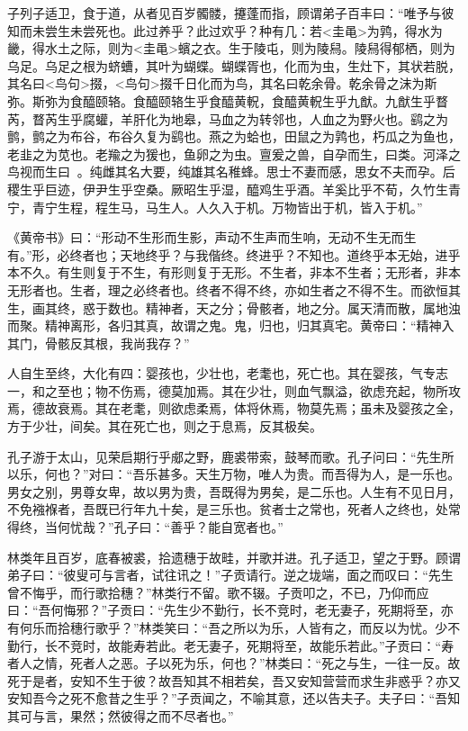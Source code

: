 \documentclass[]{article}
\begin{document}
子列子适卫，食于道，从者见百岁髑髅，攓蓬而指，顾谓弟子百丰曰：``唯予与彼知而未尝生未尝死也。此过养乎？此过欢乎？种有几：若\textless{}圭黾\textgreater{}为鹑，得水为畿，得水土之际，则为\textless{}圭黾\textgreater{}蠙之衣。生于陵屯，则为陵舄。陵舄得郁栖，则为乌足。乌足之根为蛴螬，其叶为蝴蝶。蝴蝶胥也，化而为虫，生灶下，其状若脱，其名曰\textless{}鸟句\textgreater{}掇，\textless{}鸟句\textgreater{}掇千日化而为鸟，其名曰乾余骨。乾余骨之沫为斯弥。斯弥为食醯颐辂。食醯颐辂生乎食醯黄軦，食醯黄軦生乎九猷。九猷生乎瞀芮，瞀芮生乎腐蠸，羊肝化为地皋，马血之为转邻也，人血之为野火也。鹞之为鹯，鹯之为布谷，布谷久复为鹞也。燕之为蛤也，田鼠之为鹑也，朽瓜之为鱼也，老韭之为苋也。老羭之为猨也，鱼卵之为虫。亶爰之兽，自孕而生，曰类。河泽之鸟视而生曰。纯雌其名大要，纯雄其名稚蜂。思士不妻而感，思女不夫而孕。后稷生乎巨迹，伊尹生乎空桑。厥昭生乎湿，醯鸡生乎酒。羊奚比乎不荀，久竹生青宁，青宁生程，程生马，马生人。人久入于机。万物皆出于机，皆入于机。''

《黄帝书》曰：``形动不生形而生影，声动不生声而生响，无动不生无而生有。''形，必终者也；天地终乎？与我偕终。终进乎？不知也。道终乎本无始，进乎本不久。有生则复于不生，有形则复于无形。不生者，非本不生者；无形者，非本无形者也。生者，理之必终者也。终者不得不终，亦如生者之不得不生。而欲恒其生，画其终，惑于数也。精神者，天之分；骨骸者，地之分。属天清而散，属地浊而聚。精神离形，各归其真，故谓之鬼。鬼，归也，归其真宅。黄帝曰：``精神入其门，骨骸反其根，我尚我存？''

人自生至终，大化有四：婴孩也，少壮也，老耄也，死亡也。其在婴孩，气专志一，和之至也；物不伤焉，德莫加焉。其在少壮，则血气飘溢，欲虑充起，物所攻焉，德故衰焉。其在老耄，则欲虑柔焉，体将休焉，物莫先焉；虽未及婴孩之全，方于少壮，间矣。其在死亡也，则之于息焉，反其极矣。

孔子游于太山，见荣启期行乎郕之野，鹿裘带索，鼓琴而歌。孔子问曰：``先生所以乐，何也？''对曰：``吾乐甚多。天生万物，唯人为贵。而吾得为人，是一乐也。男女之别，男尊女卑，故以男为贵，吾既得为男矣，是二乐也。人生有不见日月，不免襁褓者，吾既已行年九十矣，是三乐也。贫者士之常也，死者人之终也，处常得终，当何忧哉？''孔子曰：``善乎？能自宽者也。''

林类年且百岁，底春被裘，拾遗穗于故畦，并歌并进。孔子适卫，望之于野。顾谓弟子曰：``彼叟可与言者，试往讯之！''子贡请行。逆之垅端，面之而叹曰：``先生曾不悔乎，而行歌拾穗？''林类行不留。歌不辍。子贡叩之，不已，乃仰而应曰：``吾何悔邪？''子贡曰：``先生少不勤行，长不竞时，老无妻子，死期将至，亦有何乐而拾穗行歌乎？''林类笑曰：``吾之所以为乐，人皆有之，而反以为忧。少不勤行，长不竞时，故能寿若此。老无妻子，死期将至，故能乐若此。''子贡曰：``寿者人之情，死者人之恶。子以死为乐，何也？''林类曰：``死之与生，一往一反。故死于是者，安知不生于彼？故吾知其不相若矣，吾又安知营营而求生非惑乎？亦又安知吾今之死不愈昔之生乎？''子贡闻之，不喻其意，还以告夫子。夫子曰：``吾知其可与言，果然；然彼得之而不尽者也。''
\end{document}
